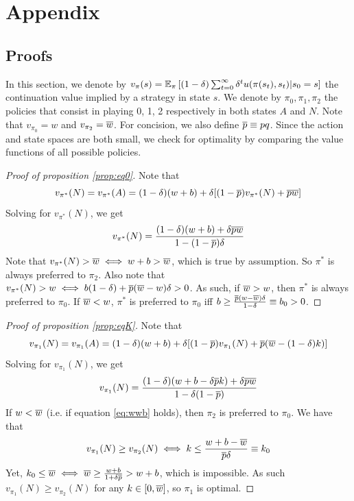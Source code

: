 {%

% 

\newpage
\section{Appendix}

\appendixpage


\subsection{Proofs}
\label{app:proofs}

In this section, we denote by $v_\pi(s) = \mathbb{E}_\pi \left[ (1-\delta) \sum_{t = 0}^\infty \delta^t u(\pi(s_t), s_t) | s_0 = s \right]$ the continuation value implied by a strategy in state $s$. We denote by $\pi_0, \pi_1, \pi_2$  the policies that consist in playing 0, 1, 2 respectively in both states $A$ and $N$. Note that $v_{\pi_0} = w$ and $v_{\pi_2} = \overline{w}$. For concision, we also define $\overline{p} \equiv pq$. Since the action and state spaces are both small, we check for optimality by comparing the value functions of all possible policies. 

\begin{proof}[Proof of proposition \ref{prop:eq0}]
    Note that 
    $$
    v_{\pi^*}(N) = v_{\pi^*}(A) = (1-\delta) (w+b) + \delta [(1-\overline{p}) v_{\pi^*}(N) + \overline{p} \overline{w}]
    $$
    Solving for $v_{\pi^*}(N)$, we get
    $$
    v_{\pi^*}(N) = \frac{(1-\delta)(w+b)+\delta \overline{p} \overline{w}}{1 - (1-\overline{p})\delta}
    $$
    Note that $v_{\pi^*}(N) > \overline{w} \iff w + b > \overline{w}$, which is true by assumption. So $\pi^*$ is always preferred to $\pi_2$. Also note that $v_{\pi^*}(N) > w \iff b (1-\delta) + \overline{p} (\overline{w} - w) \delta > 0$. As such, if $\overline{w} > w$, then $\pi^*$ is always preferred to $\pi_0$. If $\overline{w} < w$,  $\pi^*$  is preferred to $\pi_0$ iff $b \geq \frac{\overline{p} (w - \overline{w}) \delta}{1-\delta} \equiv b_0 > 0$.
\end{proof}

\begin{proof}[Proof of proposition \ref{prop:eqK}]
    Note that 
    $$
    v_{\pi_1}(N) = v_{\pi_1}(A) = (1-\delta) (w+b) + \delta [(1-\overline{p}) v_{\pi_1}(N) + \overline{p} (\overline{w} - (1-\delta) k)]
    $$
    Solving for $v_{\pi_1}(N)$, we get
    $$
    v_{\pi_1}(N) = \frac{(1-\delta)(w+b-\delta\overline{p} k)+\delta\overline{p} \overline{w}}{1-\delta(1-\overline{p})}
    $$
    If $w < \overline{w}$ (i.e. if equation \ref{eq:wwb} holds), then $\pi_2$ is preferred to $\pi_0$. We have that 
    $$
    v_{\pi_1}(N) \geq v_{\pi_2}(N) \iff k \leq \frac{w+b-\overline{w}}{\overline{p}\delta} \equiv k_0
    $$
    Yet, $k_0 \leq \overline{w} \iff \overline{w} \geq \frac{w+b}{1+\delta\overline{p}} > w+b$, which is impossible. As such $v_{\pi_1}(N) \geq v_{\pi_2}(N)$ for any $k \in [0,\overline{w}]$, so $\pi_1$ is optimal. 


\end{proof}}
